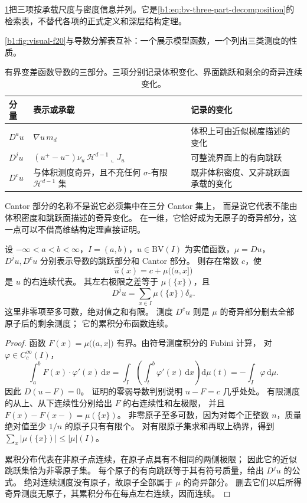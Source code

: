 \cref{b1:tab:bv-derivative-three-parts}把三项按承载尺度与密度信息并列。它是\eqref{b1:eq:bv-three-part-decomposition}的检索表，不替代各项的正式定义和深层结构定理。


\cref{b1:fig:visual-f20}与导数分解表互补：一个展示模型函数，一个列出三类测度的性质。


\begin{table}[htbp]
  \centering
  \caption[有界变差函数导数的三部分]{有界变差函数导数的三部分。三项分别记录体积变化、界面跳跃和剩余的奇异连续变化。}
  \label{b1:tab:bv-derivative-three-parts}
  \begin{tabularx}{\textwidth}{@{}p{2.5cm}p{4.6cm}X@{}}
    \toprule
    分量 & 表示或承载 & 记录的变化 \\
    \midrule
    \(D^au\) & \(\nabla u\,m_d\) & 体积上可由近似梯度描述的变化 \\
    \(D^ju\) & \((u^+-u^-)\nu_u\,\mathcal H^{d-1}\llcorner J_u\) & 可整流界面上的有向跳跃 \\
    \(D^cu\) & 与体积测度奇异，且不充任何 \(\sigma\)-有限 \(\mathcal H^{d-1}\) 集 & 既非体积密度、又非跳跃面承载的变化 \\
    \bottomrule
  \end{tabularx}
\end{table}

Cantor 部分的名称不是说它必须集中在三分 Cantor 集上，
而是说它代表不能由体积密度和跳跃面描述的奇异变化。
在一维，它恰好成为无原子的奇异部分，这一点可以不借高维结构定理直接证明。

\begin{proposition}\label{b1:prop:one-dimensional-bv-decomposition}
设 \(-\infty<a<b<\infty\)，\(I=(a,b)\)，\(u\in\mathrm{BV}(I)\) 为实值函数，\(\mu=Du\)，\(D^ju,D^cu\) 分别表示导数的跳跃部分和 Cantor 部分。
则存在常数 \(c\)，使
\[
 \widehat u(x)=c+\mu\bigl((a,x]\bigr)
\]
是 \(u\) 的右连续代表。
其左右极限之差等于 \(\mu(\{x\})\)，且
\[
 D^ju=\sum_{x\in I}\mu(\{x\})\delta_x.
\]
这里非零项至多可数，绝对值之和有限。
测度 \(D^cu\) 则是 \(\mu\) 的奇异部分删去全部原子后的剩余测度；
它的累积分布函数连续。
\end{proposition}
\begin{proof}
函数 \(F(x)=\mu\bigl((a,x]\bigr)\) 有界。由符号测度积分的 Fubini 计算，
对 \(\varphi\in C_c^\infty(I)\)，
\[
 \int_a^b F(x)\cdot\varphi'(x)\,\mathrm dx
 =\int_I\left(\int_t^b\varphi'(x)\,\mathrm dx\right)\mathrm d\mu(t)
 =-\int_I\varphi\,\mathrm d\mu.
\]
因此 \(D(u-F)=0\)。
证明的零弱导数判别说明 \(u-F=c\) 几乎处处。
有限测度的从上、从下连续性分别给出 \(F\) 的右连续性和左极限，
并且 \(F(x)-F(x-)=\mu(\{x\})\)。
非零原子至多可数，因为对每个正整数 \(n\)，质量绝对值至少 \(1/n\) 的原子只有有限个。
对有限原子集求和再取上确界，得到
\(\sum_x|\mu(\{x\})|\le|\mu|(I)\)。

累积分布代表在非原子点连续，在原子点具有不相同的两侧极限；
因此它的近似跳跃集恰为非零原子集。
每个原子的有向跳跃等于其有符号质量，给出 \(D^ju\) 的公式。
绝对连续测度没有原子，故原子全部属于 \(\mu\) 的奇异部分。
删去它们以后所得奇异测度无原子，其累积分布在每点左右连续，因而连续。
\end{proof}

